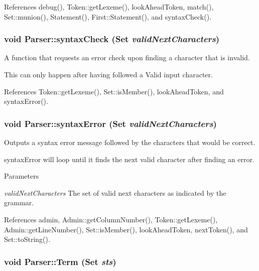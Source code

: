 References debug(), Token::getLexeme(), lookAheadToken, match(), Set::munion(), Statement(), First::Statement(), and syntaxCheck().

\hypertarget{classParser_a61a1e512e33d3498f45d1e6f7c7aaf4d}{
\subsubsection[{syntaxCheck}]{\setlength{\rightskip}{0pt plus 5cm}void Parser::syntaxCheck ({\bf Set} {\em validNextCharacters})}}
\label{classParser_a61a1e512e33d3498f45d1e6f7c7aaf4d}


A function that requests an error check upon finding a character that is invalid. 

This can only happen after having followed a Valid input character. 

References Token::getLexeme(), Set::isMember(), lookAheadToken, and syntaxError().

\hypertarget{classParser_a705ca7e2357f506dc5bea989e40ca11f}{
\subsubsection[{syntaxError}]{\setlength{\rightskip}{0pt plus 5cm}void Parser::syntaxError ({\bf Set} {\em validNextCharacters})}}
\label{classParser_a705ca7e2357f506dc5bea989e40ca11f}


Outputs a syntax error message followed by the characters that would be correct. 

syntaxError will loop until it finds the next valid character after finding an error. 
\begin{DoxyParams}{Parameters}
\item[{\em validNextCharacters}]The set of valid next characters as indicated by the grammar. \end{DoxyParams}


References admin, Admin::getColumnNumber(), Token::getLexeme(), Admin::getLineNumber(), Set::isMember(), lookAheadToken, nextToken(), and Set::toString().

\hypertarget{classParser_ab7fd24e2aeb0ad2685e11f3ea5594049}{
\subsubsection[{Term}]{\setlength{\rightskip}{0pt plus 5cm}void Parser::Term ({\bf Set} {\em sts})}}
\label{classParser_ab7fd24e2aeb0ad2685e11f3ea5594049}



